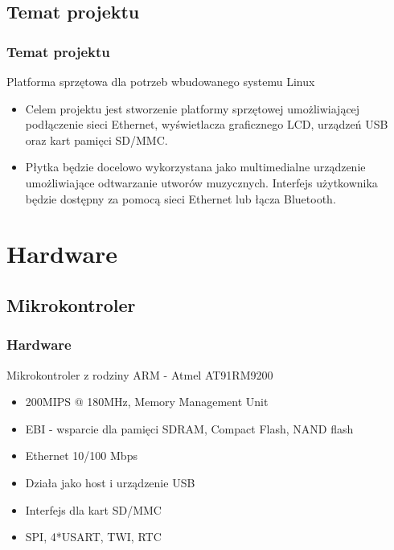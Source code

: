 \documentclass{beamer}
\newenvironment{ramka}{\begin{frame}}
{
		\end{frame}
}
\begin{document}
	\subsection{Temat projektu}
	\begin{ramka}
		\frametitle{Temat projektu}
		\begin{block}{Platforma sprzętowa dla potrzeb wbudowanego systemu Linux}
			\begin{itemize}
			\item<1->Celem projektu jest stworzenie platformy sprzętowej umożliwiającej podłączenie sieci Ethernet, wyświetlacza graficznego LCD, urządzeń USB oraz kart pamięci SD/MMC.\\
			\item<2->Płytka będzie docelowo wykorzystana jako multimedialne urządzenie umożliwiające odtwarzanie utworów muzycznych. Interfejs użytkownika będzie dostępny za pomocą sieci Ethernet lub łącza Bluetooth.
			\end{itemize}
		\end{block}
	\end{ramka} 
	
	\section{Hardware}
	\subsection{Mikrokontroler}
	\begin{ramka}
		\frametitle{Hardware}
		\begin{block}{Mikrokontroler z rodziny ARM - Atmel AT91RM9200}
			\begin{itemize}
				\item<2-> 200MIPS @ 180MHz, Memory Management Unit
				\item<3-> EBI - wsparcie dla pamięci SDRAM, Compact Flash, NAND flash
				\item<4-> Ethernet 10/100 Mbps
				\item<5-> Działa jako host i urządzenie USB
				\item<6-> Interfejs dla kart SD/MMC
				\item<7-> SPI, 4*USART, TWI, RTC
			\end{itemize}
		\end{block}
	\end{ramka} 
	
\end{document}
